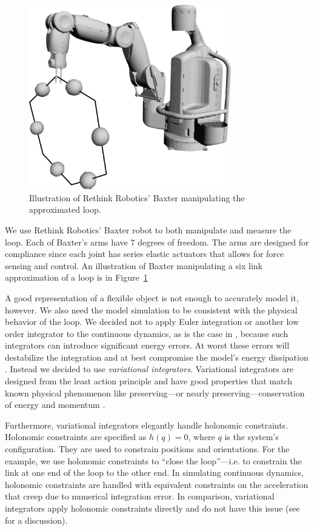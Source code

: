 \documentclass[letterpaper, 10pt, conference]{ieeeconf}
\begin{document}
\begin{figure}
\centering
\includegraphics[width = 250pt]{bloop_image_1.pdf}
\caption{Illustration of Rethink Robotics' Baxter manipulating the approximated loop.}
\label{fig-baxter_image_1}
\end{figure}

We use Rethink Robotics' Baxter \cite{guizzo2011rethink} robot to both manipulate and measure the loop.  Each of Baxter's arms have 7 degrees of freedom.  The arms are designed for compliance since each joint has series elastic actuators that allows for force sensing and control.  An illustration of Baxter manipulating a six link approximation of a loop is in Figure~\ref{fig-baxter_image_1}

A good representation of a flexible object is not enough to accurately model it, however.  We also need the model simulation to be consistent with the physical behavior of the loop.  We decided not to apply Euler integration or another low order integrator to the continuous dynamics, as is the case in \cite{sahari_etal}, because such integrators can introduce significant energy errors.  At worst these errors will destabilize the integration and at best compromise the model's energy dissipation \cite{johnson_murphey_scalable}.  Instead we decided to use \emph{variational integrators}.  Variational integrators are designed from the least action principle and have good properties that match known physical phenomenon like preserving---or nearly preserving---conservation of energy and momentum \cite{johnson_murphey_scalable, marsden_west}.

Furthermore, variational integrators elegantly handle holonomic constraints.  Holonomic constraints are specified as $h(q) = 0$, where $q$ is the system's configuration.  They are used to constrain positions and orientations.  For the example, we use holonomic constraints to ``close the loop''---i.e. to constrain the link at one end of the loop to the other end.  In simulating continuous dynamics, holonomic constraints are handled with equivalent constraints on the acceleration that creep due to numerical integration error.  In comparison, variational integrators apply holonomic constraints directly and do not have this issue (see \cite{johnson_murphey_scalable} for a discussion).
\end{document}
